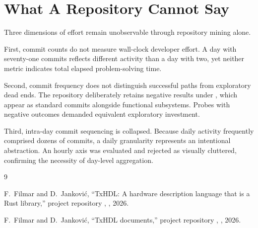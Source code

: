 \documentclass[journal,onecolumn,9pt]{IEEEtran}
\begin{document}
\section{What A Repository Cannot Say}
\label{sec:d-cannot}

Three dimensions of effort remain unobservable through repository mining alone.

First, commit counts do not measure wall-clock developer effort. A day
with seventy-one commits reflects different activity than a day with
two, yet neither metric indicates total elapsed problem-solving time.

Second, commit frequency does not distinguish successful paths from
exploratory dead ends. The repository deliberately retains negative
results under , which appear as standard
commits alongside functional subsystems. Probes with negative outcomes
demanded equivalent exploratory investment.

Third, intra-day commit sequencing is collapsed. Because daily activity
frequently comprised dozens of commits, a daily granularity represents
an intentional abstraction. An hourly axis was evaluated and rejected as
visually cluttered, confirming the necessity of day-level aggregation.

\begin{thebibliography}{9}

F.~Filmar and D.~Janković, ``TxHDL: A hardware description language
that is a Rust library,'' project repository ,
, 2026.

F.~Filmar and D.~Janković, ``TxHDL documents,'' project repository
, , 2026.

\end{thebibliography}
\end{document}
